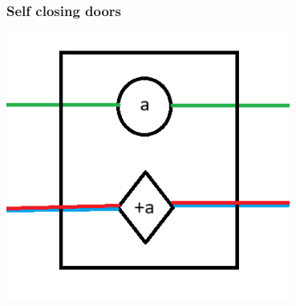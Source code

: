 \documentclass{beamer}
\begin{document}
\begin{frame}
  \frametitle{Self closing doors}
  \begin{center}
    \includegraphics[width=0.7\textwidth]{res/SelfClosingDoor.png}
  \end{center}
\end{frame}
\end{document}
